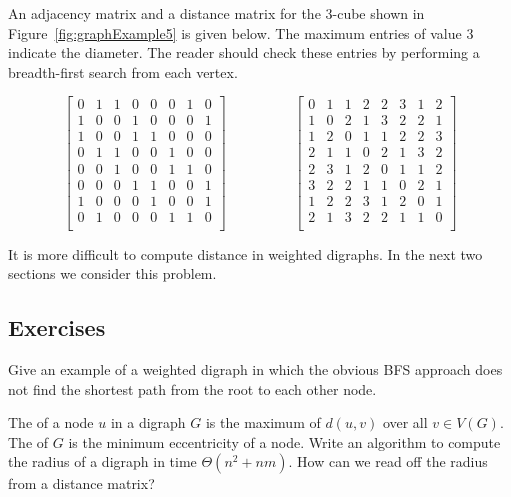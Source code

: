 \begin{Example}
An adjacency matrix and a distance matrix for the 3-cube shown in
Figure~\ref{fig:graphExample5} is given below.  The maximum entries of
value $3$ indicate the diameter. The reader should check these entries
by performing a breadth-first search from each vertex.

\[
\left[
\begin{array}{cccccccc}
0& 1& 1& 0& 0& 0& 1& 0\\
1& 0& 0& 1& 0& 0& 0& 1 \\
1& 0& 0& 1& 1& 0& 0& 0\\
0& 1& 1& 0& 0& 1& 0& 0 \\
0& 0& 1& 0& 0& 1& 1& 0 \\
0& 0& 0& 1& 1& 0& 0& 1 \\
1& 0& 0& 0& 1& 0& 0& 1 \\
0& 1& 0& 0& 0& 1& 1& 0 \\
\end{array}
\right]
\hspace{2cm}
\left[
\begin{array}{cccccccc}
0& 1& 1& 2& 2& 3& 1& 2\\
1& 0& 2& 1& 3& 2& 2& 1\\
1& 2& 0& 1& 1& 2& 2& 3\\
2& 1& 1& 0& 2& 1& 3& 2\\
2& 3& 1& 2& 0& 1& 1& 2\\
3& 2& 2& 1& 1& 0& 2& 1\\
1& 2& 2& 3& 1& 2& 0& 1\\
2& 1& 3& 2& 2& 1& 1& 0\\
\end{array}
\right]
\]

\end{Example}

It is more difficult to compute distance in weighted digraphs. In the
next two sections we consider this problem.

\subsection*{Exercises}

\begin{Exercise}
\label{ex:BFSfails}
Give an example of a weighted digraph in which the obvious BFS approach
does not find the shortest path from the root to each other node.
\end{Exercise}

\begin{Exercise}
\label{ex:radius}
The  of a node $u$ in a  digraph $G$  is the
maximum of $d(u, v)$ over all $v\in V(G)$. The  of $G$
is the minimum eccentricity of a node. Write an
algorithm to compute the radius of a digraph in time $\Theta(n^2 +
nm)$. How can we read off the radius from a distance matrix?
\end{Exercise}

